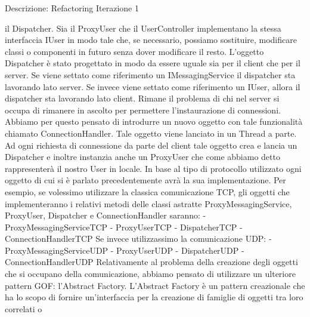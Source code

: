 \begin{frame}[allowframebreaks] {Descrizione: Refactoring Iterazione 1}
\begin{scriptsize}
   il Dispatcher. Sia il ProxyUser che il UserController implementano la stessa interfaccia IUser in modo tale che, se necessario, possiamo sostituire, modificare 
   classi o componenti in futuro senza dover modificare il resto. 
   \newline L'oggetto Dispatcher è stato progettato in modo da essere uguale sia per il client che per il server. Se viene settato come riferimento un 
   IMessagingService il dispatcher sta lavorando lato server. Se invece viene settato come riferimento un IUser, allora il dispatcher sta lavorando lato client.
   \newline
   Rimane il problema di chi nel server si occupa di rimanere in ascolto per permettere l'instaurazione di connessioni. Abbiamo per questo pensato di introdurre un 
   nuovo oggetto con tale funzionalità chiamato ConnectionHandler. Tale oggetto viene lanciato in un Thread a parte. Ad ogni richiesta di connessione da parte del 
   client tale oggetto crea e lancia un Dispatcher e inoltre instanzia anche un ProxyUser che come abbiamo detto rappresenterà il nostro User in locale.
   \newline
   In base al tipo di protocollo utilizzato ogni oggetto di cui si è parlato precedentemente avrà la sua implementazione. Per esempio, se volessimo utilizzare la    
   classica comunicazione TCP, gli oggetti che implementeranno i relativi metodi delle classi astratte ProxyMessagingService, ProxyUser, Dispatcher e 
   ConnectionHandler saranno:
   \newline
   - ProxyMessagingServiceTCP
   \newline
   - ProxyUserTCP
   \newline
   - DispatcherTCP
   \newline 
   - ConnectionHandlerTCP 
   \newline 
   Se invece utilizzassimo la comunicazione UDP:
   \newline
   - ProxyMessagingServiceUDP
   \newline
   - ProxyUserUDP
   \newline
   - DispatcherUDP
   \newline 
   - ConnectionHandlerUDP 
   \newline 
   Relativamente al problema della creazione degli oggetti che si occupano della comunicazione, abbiamo pensato di utilizzare un ulteriore pattern GOF: l'Abstract 
   Factory. L'Abstract Factory è un pattern creazionale che ha lo scopo di fornire un'interfaccia per la creazione di famiglie di oggetti tra loro correlati o 

\end{scriptsize}
\end{frame}
